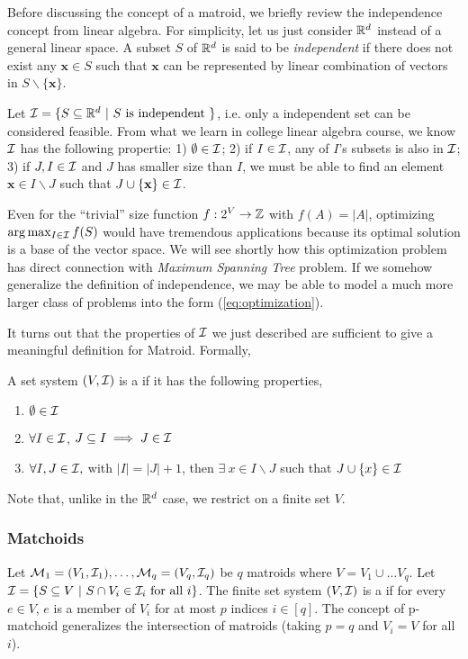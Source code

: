 Before discussing the concept of a matroid, we briefly review the independence concept from linear algebra. For simplicity, let us just consider $\mathbb{R}^d$ instead of a general linear space. A subset $S$ of $\mathbb{R}^d$ is said to be \emph{independent} if there does not exist any $\mathbf{x}\in S$ such that $\mathbf{x}$ can be represented by linear combination of vectors in $S\backslash\{\mathbf{x}\}$. 

Let $\mathcal{I} = \{S \subseteq \mathbb{R}^d~|~S ~\text{is independent}~\}$, i.e. only a independent set can be considered feasible. From what we learn in college linear algebra course, we know $\mathcal{I}$ has the following propertie: 1) $\emptyset \in \mathcal{I}$; 2) if $I\in \mathcal{I}$, any of $I$'s subsets is also in $\mathcal{I}$; 3) if $J, I\in \mathcal{I}$ and $J$ has smaller size than $I$, we must be able to find an element  $\mathbf{x} \in I\backslash J$ such that $J\cup \{\mathbf{x}\} \in \mathcal{I}$. 

Even for the ``trivial'' size function $f: 2^V \rightarrow \mathbb{Z}$ with $f(A) = |A|$, optimizing $\arg\max_{I\in\mathcal{I}} f(S)$ would have tremendous applications because its optimal solution is a base of the vector space. We will see shortly how this optimization problem has direct connection with \emph{Maximum Spanning Tree} problem. If we somehow generalize the definition of independence, we may be able to model a much more larger class of problems into the form (\ref{eq:optimization}). 

It turns out that the properties of $\mathcal{I}$ we just described are sufficient to give a meaningful definition for Matroid. Formally, 
\begin{definition}[Matroid]
\label{def:matroid}
  A set system $(V, \mathcal{I})$ is a  if it has the following properties,
  \begin{enumerate}
  \item $\emptyset \in \mathcal{I}$
  \item $\forall I \in \mathcal{I}$, $J\subseteq I \implies J\in \mathcal{I}$
  \item $\forall I, J \in \mathcal{I},$ with $|I| = |J| + 1$,  then $\exists~ x\in I\backslash J$ such that $J \cup \{x\}\in \mathcal{I}$ 
  \end{enumerate} 
\end{definition}
Note that, unlike in the $\mathbb{R}^d$ case, we restrict on a finite set $V$. 


\subsubsection{Matchoids}
Let $\mathcal{M}_1 = (V_1, \mathcal{I}_1),\ldots, \mathcal{M}_q = (V_q, \mathcal{I}_q)$ be $q$ matroids where $V = V_1\cup\ldots V_q$. Let $\mathcal{I} = \{S\subseteq V~|~ S\cap V_i \in \mathcal{I}_i ~\text{for all}~ i\}$. The finite set system $(V, \mathcal{I})$ is a  if for every $e\in V$, $e$ is a member of $V_i$ for at most $p$ indices $i \in [q]$. The concept of p-matchoid generalizes the intersection of matroids (taking $p = q$ and $V_i = V$ for all $i$).

